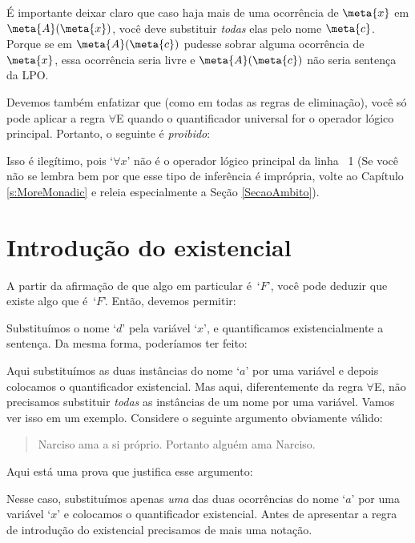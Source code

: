 É importante deixar claro que caso haja mais de uma ocorrência de $\meta{x}$ em  $\meta{A}(\meta{x})$, você deve substituir \textit{todas} elas pelo nome $\meta{c}$.
Porque se em $\meta{A}(\meta{c})$ pudesse sobrar alguma ocorrência de $\meta{x}$, essa ocorrência seria livre e $\meta{A}(\meta{c})$ não seria sentença da LPO.

Devemos também enfatizar que (como em todas as regras de eliminação), você só pode aplicar a regra $\forall$E quando o quantificador universal for o operador lógico principal. Portanto, o seguinte é \emph{proibido}:
\begin{fitchproof}
\end{fitchproof}
Isso é ilegítimo, pois `$\forall x$' não é o  operador lógico principal da linha ~1  (Se você não se lembra bem por que esse tipo de inferência é imprópria, volte ao Capítulo \ref{s:MoreMonadic} e releia especialmente a Seção \ref{SecaoAmbito}).



\section{Introdução do existencial}
A partir da afirmação de que algo em particular é~`$F$', você pode deduzir que existe algo que é~`$F$'. Então, devemos permitir:
\begin{fitchproof}
	 
\end{fitchproof}
 
Substituímos o nome `$d$' pela variável `$x$',  e quantificamos existencialmente a sentença. Da mesma forma,  poderíamos ter feito:
\begin{fitchproof}
	 
\end{fitchproof}
Aqui substituímos as duas instâncias do nome `$a$' por uma variável e depois colocamos o quantificador existencial. Mas aqui, diferentemente da regra $\forall$E, não precisamos substituir  \emph{todas}  as instâncias de um nome por  uma variável.
Vamos ver isso em um exemplo. Considere o seguinte argumento obviamente válido:

	\begin{quote}
		Narciso ama a si próprio. Portanto alguém ama Narciso.
	\end{quote}
Aqui está uma prova que justifica esse argumento:
\begin{fitchproof}
	 
\end{fitchproof}
Nesse caso, substituímos apenas \emph{uma} das duas ocorrências do nome `$a$' por uma variável `$x$' e colocamos o quantificador existencial.
Antes de apresentar a regra de introdução do existencial precisamos de mais uma notação.

